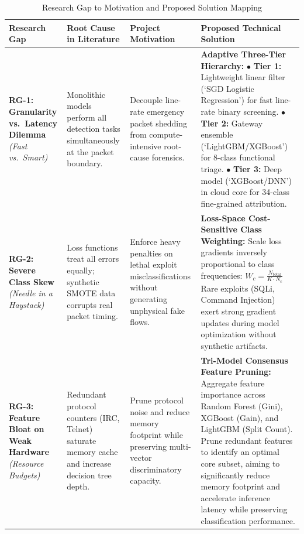 \documentclass[12pt,a4paper]{report}
\begin{document}
\begin{table}[ht]
\centering
\caption{Research Gap to Motivation and Proposed Solution Mapping}
\label{tab:gap_mapping}
\small
\begin{tabular}{@{}p{3.2cm}p{3.2cm}p{3.8cm}p{4.5cm}@{}}
\toprule
\textbf{Research Gap} & \textbf{Root Cause in Literature} & \textbf{Project Motivation} & \textbf{Proposed Technical Solution}\\
\midrule
\textbf{RG-1: Granularity vs.\ Latency Dilemma} \newline \emph{(Fast vs.\ Smart)} & Monolithic models perform all detection tasks simultaneously at the packet boundary. & Decouple line-rate emergency packet shedding from compute-intensive root-cause forensics. & \textbf{Adaptive Three-Tier Hierarchy:} \newline $\bullet$ \textbf{Tier 1:} Lightweight linear filter (`SGD Logistic Regression') for fast line-rate binary screening. \newline $\bullet$ \textbf{Tier 2:} Gateway ensemble (`LightGBM/XGBoost') for 8-class functional triage. \newline $\bullet$ \textbf{Tier 3:} Deep model (`XGBoost/DNN') in cloud core for 34-class fine-grained attribution. \\
\addlinespace
\textbf{RG-2: Severe Class Skew} \newline \emph{(Needle in a Haystack)} & Loss functions treat all errors equally; synthetic SMOTE data corrupts real packet timing. & Enforce heavy penalties on lethal exploit misclassifications without generating unphysical fake flows. & \textbf{Loss-Space Cost-Sensitive Class Weighting:} \newline Scale loss gradients inversely proportional to class frequencies: \newline $W_c = \frac{N_{\text{total}}}{K \cdot N_c}$ \newline Rare exploits (SQLi, Command Injection) exert strong gradient updates during model optimization without synthetic artifacts. \\
\addlinespace
\textbf{RG-3: Feature Bloat on Weak Hardware} \newline \emph{(Resource Budgets)} & Redundant protocol counters (IRC, Telnet) saturate memory cache and increase decision tree depth. & Prune protocol noise and reduce memory footprint while preserving multi-vector discriminatory capacity. & \textbf{Tri-Model Consensus Feature Pruning:} \newline Aggregate feature importance across Random Forest (Gini), XGBoost (Gain), and LightGBM (Split Count). \newline Prune redundant features to identify an optimal core subset, aiming to significantly reduce memory footprint and accelerate inference latency while preserving classification performance. \\
\bottomrule
\end{tabular}
\end{table}
\end{document}
